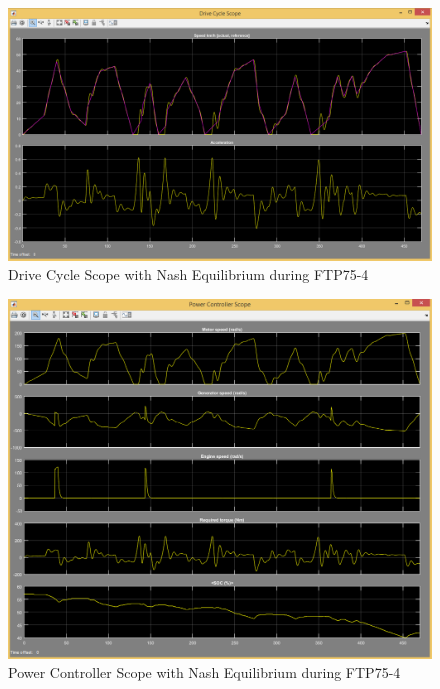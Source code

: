\begin{figure}[h]
\centering
\includegraphics[scale=0.4]{figures/NashEquilibrium/FTP75-4/driveCycle15Juni}
\caption{Drive Cycle Scope with Nash Equilibrium during FTP75-4}
\label{fig:dcne4}
\end{figure}

\begin{figure}[h]
\centering
\includegraphics[scale=0.4]{figures/NashEquilibrium/FTP75-4/powerController15Juni}
\caption{Power Controller Scope with Nash Equilibrium during FTP75-4}
\label{fig:pcne4}
\end{figure}



